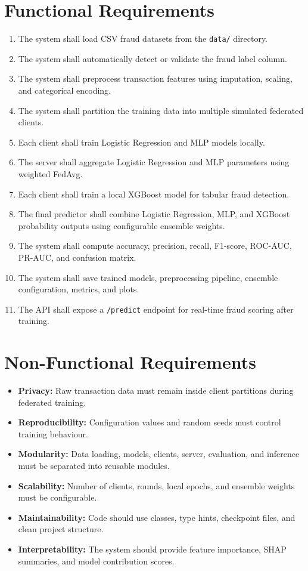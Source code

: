 \section{Functional Requirements}
\begin{enumerate}
    \item The system shall load CSV fraud datasets from the \texttt{data/} directory.
    \item The system shall automatically detect or validate the fraud label column.
    \item The system shall preprocess transaction features using imputation, scaling, and categorical encoding.
    \item The system shall partition the training data into multiple simulated federated clients.
    \item Each client shall train Logistic Regression and MLP models locally.
    \item The server shall aggregate Logistic Regression and MLP parameters using weighted FedAvg.
    \item Each client shall train a local XGBoost model for tabular fraud detection.
    \item The final predictor shall combine Logistic Regression, MLP, and XGBoost probability outputs using configurable ensemble weights.
    \item The system shall compute accuracy, precision, recall, F1-score, ROC-AUC, PR-AUC, and confusion matrix.
    \item The system shall save trained models, preprocessing pipeline, ensemble configuration, metrics, and plots.
    \item The API shall expose a \texttt{/predict} endpoint for real-time fraud scoring after training.
\end{enumerate}

\section{Non-Functional Requirements}
\begin{itemize}
    \item \textbf{Privacy:} Raw transaction data must remain inside client partitions during federated training.
    \item \textbf{Reproducibility:} Configuration values and random seeds must control training behaviour.
    \item \textbf{Modularity:} Data loading, models, clients, server, evaluation, and inference must be separated into reusable modules.
    \item \textbf{Scalability:} Number of clients, rounds, local epochs, and ensemble weights must be configurable.
    \item \textbf{Maintainability:} Code should use classes, type hints, checkpoint files, and clean project structure.
    \item \textbf{Interpretability:} The system should provide feature importance, SHAP summaries, and model contribution scores.
\end{itemize}



